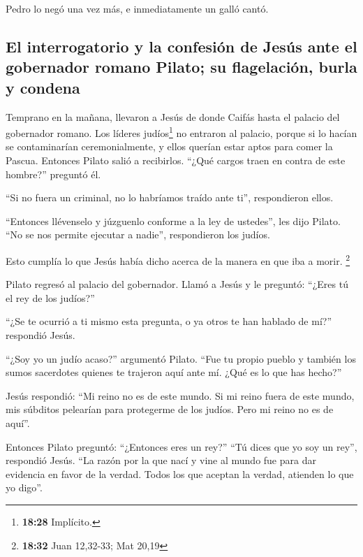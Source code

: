  Pedro lo negó una vez más, e inmediatamente un galló
cantó.

\hypertarget{el-interrogatorio-y-la-confesiuxf3n-de-jesuxfas-ante-el-gobernador-romano-pilato-su-flagelaciuxf3n-burla-y-condena}{%
\subsection{El interrogatorio y la confesión de Jesús ante el gobernador
romano Pilato; su flagelación, burla y
condena}\label{el-interrogatorio-y-la-confesiuxf3n-de-jesuxfas-ante-el-gobernador-romano-pilato-su-flagelaciuxf3n-burla-y-condena}}

 Temprano en la mañana, llevaron a Jesús de donde Caifás
hasta el palacio del gobernador romano. Los líderes judíos\footnote{\textbf{18:28}
  Implícito.} no entraron al palacio, porque si lo hacían se
contaminarían ceremonialmente, y ellos querían estar aptos para comer la
Pascua.  Entonces Pilato salió a recibirlos. ``¿Qué
cargos traen en contra de este hombre?'' preguntó él.

 ``Si no fuera un criminal, no lo habríamos traído ante
ti'', respondieron ellos.

 ``Entonces llévenselo y júzguenlo conforme a la ley de
ustedes'', les dijo Pilato. ``No se nos permite ejecutar a nadie'',
respondieron los judíos.

 Esto cumplía lo que Jesús había dicho acerca de la
manera en que iba a morir. \footnote{\textbf{18:32} Juan 12,32-33; Mat
  20,19}

 Pilato regresó al palacio del gobernador. Llamó a Jesús
y le preguntó: ``¿Eres tú el rey de los judíos?''

 ``¿Se te ocurrió a ti mismo esta pregunta, o ya otros te
han hablado de mí?'' respondió Jesús.

 ``¿Soy yo un judío acaso?'' argumentó Pilato. ``Fue tu
propio pueblo y también los sumos sacerdotes quienes te trajeron aquí
ante mí. ¿Qué es lo que has hecho?''

 Jesús respondió: ``Mi reino no es de este mundo. Si mi
reino fuera de este mundo, mis súbditos pelearían para protegerme de los
judíos. Pero mi reino no es de aquí''.

 Entonces Pilato preguntó: ``¿Entonces eres un rey?''
``Tú dices que yo soy un rey'', respondió Jesús. ``La razón por la que
nací y vine al mundo fue para dar evidencia en favor de la verdad. Todos
los que aceptan la verdad, atienden lo que yo digo''.

